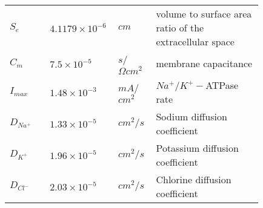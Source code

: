 \documentclass[fleqn]{report}
\numberwithin{equation}{section}
\numberwithin{equation}{section}
\begin{document}
\begin{table*}[h!]
\begin{tabular}{| p{0.15\linewidth} | >{\footnotesize} p{0.14\linewidth} | >{\footnotesize} p{0.14\linewidth} | >{\footnotesize} p{0.4\linewidth} |}
				            				$S_e$&$4.1179\times10^{-6}$&$cm$&volume to surface area ratio of the extracellular space\\
				            				$C_m$&$7.5\times10^{-5}$&$s$/$\Omega cm^2$&membrane capacitance\\
				            				$I_{max}$&$1.48\times10^{-3}$&$mA$/$cm^2$&$Na^+/K^+-$ATPase rate\\
				            				$D_{Na^+}$&$1.33\times10^{-5}$&$cm^2/s$&Sodium diffusion coefficient\\
				            				$D_{K^+}$&$1.96\times10^{-5}$&$cm^2/s$&Potassium diffusion coefficient\\
				            				$D_{Cl^-}$&$2.03\times10^{-5}$&$cm^2/s$&Chlorine diffusion coefficient\\
				            				 
				            				\hline
				            				
				            				\end{tabular}
				            				\end{table*}
				            				
\end{document}
